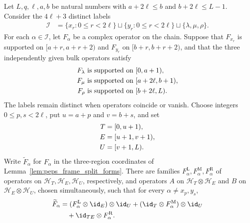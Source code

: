 \begin{lemma}
    \label{thm:chain_two_window_factors}
    \leanok
    Let $L,q,\ell,a,b$ be natural numbers with $a+2\ell\le b$ and
    $b+2\ell\le L-1$. Consider the $4\ell+3$ distinct labels
    \begin{align}
        \mathcal I
         & =\{x_r:0\le r<2\ell\}\sqcup\{y_r:0\le r<2\ell\}
        \sqcup\{\lambda,\mu,\rho\}.
        \label{eq:chain_two_window_alphabet}
    \end{align}
    For each $\alpha\in\mathcal I$, let $F_\alpha$ be a complex operator
    on the chain. Suppose that $F_{x_r}$ is supported on $[a+r,a+r+2)$
    and $F_{y_r}$ on $[b+r,b+r+2)$, and that the three independently
    given bulk operators satisfy
    \begin{align}
        F_\lambda & \text{ is supported on }[0,a+1),\notag       \\
        F_\mu     & \text{ is supported on }[a+2\ell,b+1),\notag \\
        F_\rho    & \text{ is supported on }[b+2\ell,L).
        \label{eq:chain_two_window_bulk_supports}
    \end{align}
    The labels remain distinct when operators coincide or vanish.
    Choose integers $0\le p,s<2\ell$, put $u=a+p$ and $v=b+s$, and set
    \begin{align}
        T & =[0,u+1),\notag   \\
        E & =[u+1,v+1),\notag \\
        U & =[v+1,L).
        \label{eq:chain_two_window_regions}
    \end{align}
    Write $\widetilde F_\alpha$ for $F_\alpha$ in the three-region
    coordinates of Lemma~\ref{lem:peps_frame_split_forms}.
    There are families $F^{\mathrm L}_\alpha,F^{\mathrm M}_\alpha,
        F^{\mathrm R}_\alpha$ of operators on $\mathcal H_T,\mathcal H_E,
        \mathcal H_U$, respectively, and operators $A$ on
    $\mathcal H_T\otimes\mathcal H_E$ and $B$ on
    $\mathcal H_E\otimes\mathcal H_U$, chosen simultaneously, such that
    for every $\alpha\ne x_p,y_s$,
    \begin{align}
        \widetilde F_\alpha
         & =(F^{\mathrm L}_\alpha\otimes\id_E)\otimes\id_U
        +(\id_T\otimes F^{\mathrm M}_\alpha)\otimes\id_U\notag \\
         & \quad+\id_{TE}\otimes F^{\mathrm R}_\alpha.

\end{align}
\end{lemma}
